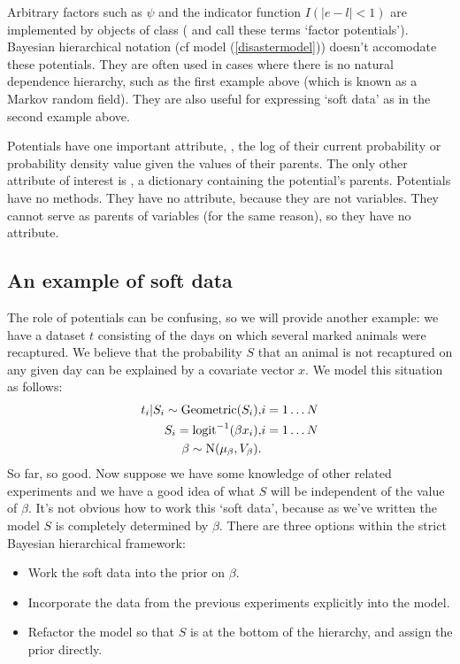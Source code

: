 \documentclass[]{jss}
\begin{document}
Arbitrary factors such as $\psi$ and the indicator function $I(|e-l|<1)$ are
implemented by objects of class  (\citet{dawidmarkov} and
\citet{Jordan:2004p5439} call these terms `factor potentials'). Bayesian
hierarchical notation (cf model (\ref{disastermodel})) doesn't accomodate these
potentials. They are often used in cases where there is no natural dependence
hierarchy, such as the first example above (which is known as a Markov random
field). They are also useful for expressing `soft data'
\citep{Christakos:2002p5506} as in the second example above.


\bigskip
Potentials have one important attribute, , the log of their current probability or probability density value given the values of their parents. The only other attribute of interest is , a dictionary containing the potential's parents. Potentials have no methods. They have no  attribute, because they are not variables. They cannot serve as parents of variables (for the same reason), so they have no  attribute.

\subsection{An example of soft data}
The role of potentials can be confusing, so we will provide another example: we have a dataset $t$ consisting of the days on which several marked animals were recaptured. We believe that the probability $S$ that an animal is not recaptured on any given day can be explained by a covariate vector $x$. We model this situation as follows:
\begin{eqnarray*}
    t_i|S_i \sim \textup{Geometric}(S_i), & i=1\ldots N\\
    S_i = \textup{logit}^{-1}(\beta x_i), &i=1\ldots N\\
    \beta\sim \textup{N}(\mu_\beta, V_\beta).
\end{eqnarray*}
So far, so good. Now suppose we have some knowledge of other related experiments and we have a good idea of what $S$ will be independent of the value of $\beta$. It's not obvious how to work this `soft data', because as we've written the model $S$ is completely determined by $\beta$. There are three options within the strict Bayesian hierarchical framework:
\begin{itemize}
    \item Work the soft data into the prior on $\beta$.
    \item Incorporate the data from the previous experiments explicitly into the model.
    \item Refactor the model so that $S$ is at the bottom of the hierarchy, and assign the prior directly.
\end{itemize}
\end{document}
